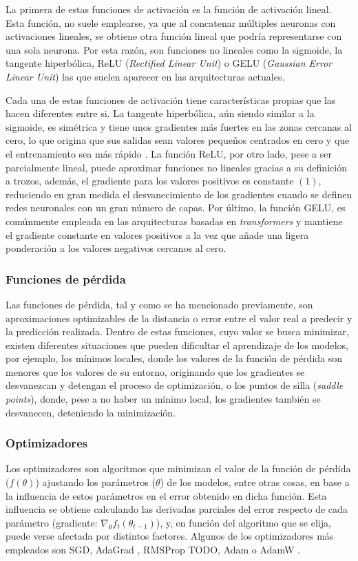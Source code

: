 La primera de estas funciones de activación es la función de activación lineal. Esta función, no suele emplearse, ya que al concatenar múltiples neuronas con activaciones lineales, se obtiene otra función lineal que podría representarse con una sola neurona. Por esta razón, son funciones no lineales como la sigmoide, la tangente hiperbólica, ReLU (\textit{Rectified Linear Unit}) \cite{relu} o GELU (\textit{Gaussian Error Linear Unit}) \cite{gelu} las que suelen aparecer en las arquitecturas actuales. 

Cada una de estas funciones de activación tiene características propias que las hacen diferentes entre si. La tangente hiperbólica, aún siendo similar a la sigmoide, es simétrica y tiene unos gradientes más fuertes en las zonas cercanas al cero, lo que origina que sus salidas sean valores pequeños centrados en cero y que el entrenamiento sea más rápido \cite{lecun2012efficient}. La función ReLU, por otro lado, pese a ser parcialmente lineal, puede aproximar funciones no lineales gracias a su definición a trozos, además, el gradiente para los valores positivos es constante $(1)$, reduciendo en gran medida el desvanecimiento de los gradientes cuando se definen redes neuronales con un gran número de capas. Por último, la función GELU, es comúnmente empleada en las arquitecturas basadas en \textit{transformers} y mantiene el gradiente constante en valores positivos a la vez que añade una ligera ponderación a los valores negativos cercanos al cero.

\subsubsection{Funciones de pérdida}
Las funciones de pérdida, tal y como se ha mencionado previamente, son aproximaciones optimizables de la distancia o error entre el valor real a predecir y la predicción realizada. Dentro de estas funciones, cuyo valor se busca minimizar, existen diferentes situaciones que pueden dificultar el aprendizaje de los modelos, por ejemplo, los mínimos locales, donde los valores de la función de pérdida son menores que los valores de su entorno, originando que los gradientes se desvanezcan y detengan el proceso de optimización, o los puntos de silla (\textit{saddle points}), donde, pese a no haber un mínimo local, los gradientes también se desvanecen, deteniendo la minimización.

\subsubsection{Optimizadores}
Los optimizadores son algoritmos que minimizan el valor de la función de pérdida ($f(\theta)$) ajustando los parámetros ($\theta$) de los modelos, entre otras cosas, en base a la influencia de estos parámetros en el error obtenido en dicha función. Esta influencia se obtiene calculando las derivadas parciales del error respecto de cada parámetro (gradiente: $\nabla_{\theta} f_t(\theta_{t-1})$), y, en función del algoritmo que se elija, puede verse afectada por distintos factores. Algunos de los optimizadores más empleados son SGD, AdaGrad \cite{adagrad}, RMSProp \cite{rmsprop} TODO, Adam \cite{adam} o AdamW \cite{adamw}.

